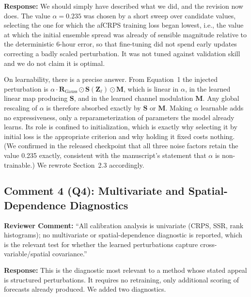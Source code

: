 \documentclass[12pt]{article}
\begin{document}
\textbf{Response:} We should simply have described what we did, and the revision now
does. The value $\alpha=0.235$ was chosen by a short sweep over candidate values,
selecting the one for which the afCRPS training loss began lowest, i.e., the
value at which the initial ensemble spread was already of sensible magnitude relative
to the deterministic 6-hour error, so that fine-tuning did not spend early updates
correcting a badly scaled perturbation. It was not tuned against validation skill and
we do not claim it is optimal.

On learnability, there is a precise answer. From Equation~1 the injected perturbation
is $\alpha \cdot \mathbf{R}_{\text{Gauss}} \odot \mathbf{S}(\mathbf{Z}_\ell) \odot
\mathbf{M}$, which is linear in $\alpha$, in the learned linear map producing
$\mathbf{S}$, and in the learned channel modulation $\mathbf{M}$. Any global rescaling
of $\alpha$ is therefore absorbed exactly by $\mathbf{S}$ or $\mathbf{M}$. Making
$\alpha$ learnable adds no expressiveness, only a reparameterization of parameters the
model already learns. Its role is confined to initialization, which is exactly why
selecting it by initial loss is the appropriate criterion and why holding it fixed
costs nothing. (We confirmed in the released checkpoint that all three noise
factors retain the value 0.235 exactly, consistent with the manuscript's statement
that $\alpha$ is non-trainable.) We rewrote Section~2.3 accordingly.

\subsection*{Comment 4 (Q4): Multivariate and Spatial-Dependence Diagnostics}

\textbf{Reviewer Comment:} ``All calibration analysis is univariate (CRPS, SSR, rank
histograms); no multivariate or spatial-dependence diagnostic is reported, which is
the relevant test for whether the learned perturbations capture
cross-variable/spatial covariance.''

\textbf{Response:} This is the diagnostic most relevant to a method whose stated
appeal is structured perturbations. It requires no retraining, only additional
scoring of forecasts already produced. We added two diagnostics.
\end{document}

